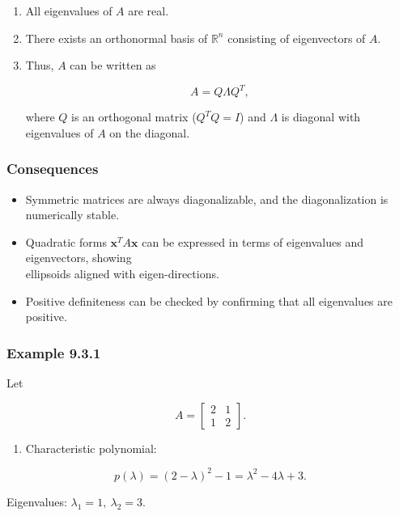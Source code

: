 \documentclass[
  12pt,
  a4paper,
]{article}
\begin{document}
\begin{enumerate}
\def\labelenumi{\arabic{enumi}.}
\item
  All eigenvalues of \(A\) are real.
\item
  There exists an orthonormal basis of \(\mathbb{R}^n\) consisting of
  eigenvectors of \(A\).
\item
  Thus, \(A\) can be written as

  \[A = Q \Lambda Q^T,\]

  where \(Q\) is an orthogonal matrix (\(Q^T Q = I\)) and \(\Lambda\) is
  diagonal with eigenvalues of \(A\) on the diagonal.
\end{enumerate}

\subsubsection{Consequences}\label{consequences}

\begin{itemize}
\item
  Symmetric matrices are always diagonalizable, and the diagonalization
  is numerically stable.
\item
  Quadratic forms \(\mathbf{x}^T A \mathbf{x}\) can be expressed in
  terms of eigenvalues and eigenvectors, showing\\
  ellipsoids aligned with eigen-directions.
\item
  Positive definiteness can be checked by confirming that all
  eigenvalues are positive.
\end{itemize}

\subsubsection{Example 9.3.1}\label{example-931}

Let

\[A = \begin{bmatrix}
2 & 1 \\
1 & 2 \end{bmatrix}.\]

\begin{enumerate}
\def\labelenumi{\arabic{enumi}.}
\item
  Characteristic polynomial:
\end{enumerate}

\[p(\lambda) = (2-\lambda)^2 - 1 = \lambda^2 - 4\lambda + 3.\]

Eigenvalues: \(\lambda_1 = 1, \ \lambda_2 = 3\).
\end{document}
